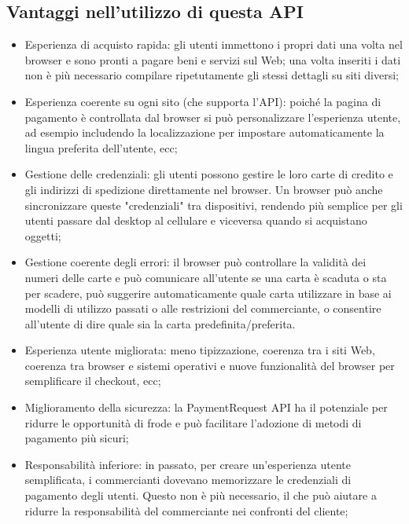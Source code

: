 \documentclass[italian]{article}
\begin{document}
	\subsection{Vantaggi nell'utilizzo di questa API}
	\begin{itemize}
	\item Esperienza di acquisto rapida: gli utenti immettono i propri dati una volta nel browser e sono pronti a pagare beni e servizi sul Web; una volta inseriti i dati non è più necessario compilare ripetutamente gli stessi dettagli su siti diversi;
	\item Esperienza coerente su ogni sito (che supporta l'API):  poiché la pagina di pagamento è controllata dal browser si può personalizzare l'esperienza utente, ad esempio includendo la localizzazione per impostare automaticamente la lingua preferita dell'utente, ecc;
	\item Gestione delle credenziali: gli utenti possono gestire le loro carte di credito e gli indirizzi di spedizione direttamente nel browser. Un browser può anche sincronizzare queste "credenziali" tra dispositivi, rendendo più semplice per gli utenti passare dal desktop al cellulare e viceversa quando si acquistano oggetti;
	\item Gestione coerente degli errori: il browser può controllare la validità dei numeri delle carte e può comunicare all'utente se una carta è scaduta o sta per scadere, può suggerire automaticamente quale carta utilizzare in base ai modelli di utilizzo passati o alle restrizioni del commerciante, o consentire all'utente di dire quale sia la carta predefinita/preferita.
	\item Esperienza utente migliorata: meno tipizzazione, coerenza tra i siti Web, coerenza tra browser e sistemi operativi e nuove funzionalità del browser per semplificare il checkout, ecc;
	\item Miglioramento della sicurezza: la PaymentRequest API ha il potenziale per ridurre le opportunità di frode e può facilitare l'adozione di metodi di pagamento più sicuri;
	\item Responsabilità inferiore: in passato, per creare un'esperienza utente semplificata, i commercianti dovevano memorizzare le credenziali di pagamento degli utenti. Questo non è più necessario, il che può aiutare a ridurre la responsabilità del commerciante nei confronti del cliente;
	\end{itemize}
	
\end{document}
